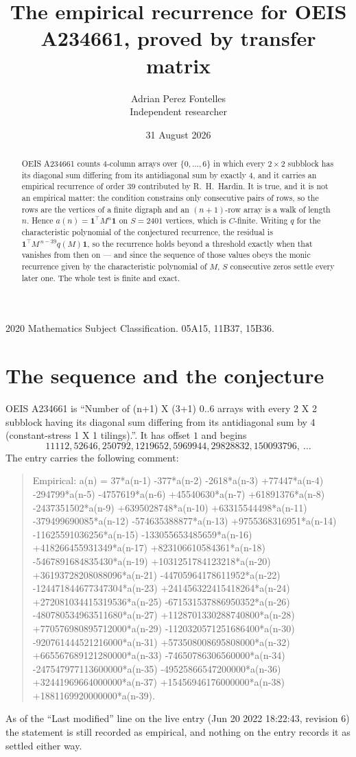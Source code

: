 \documentclass[11pt,a4paper]{article}
\title{The empirical recurrence for OEIS A234661, proved by transfer matrix}
\author{Adrian Perez Fontelles\\ \small Independent researcher}
\date{31 August 2026}
\theoremstyle{plain}
\theoremstyle{definition}
\begin{document}
\maketitle

\begin{abstract}
OEIS A234661 counts $4$-column arrays over $\{0,\dots,6\}$ in which every
$2\times2$ subblock has its diagonal sum differing from its antidiagonal sum by
exactly $4$, and it
carries an empirical recurrence of order $39$ contributed by R.~H.~Hardin. It is true,
and it is not an empirical matter: the condition constrains only consecutive pairs of rows,
so the rows are the vertices of a finite digraph and an $(n+1)$-row array is a walk of
length $n$. Hence $a(n)=\mathbf{1}^{\!\top}M^{n}\mathbf{1}$ on $S=2401$ vertices, which
is $C$-finite. Writing $q$ for the characteristic polynomial of the conjectured recurrence,
the residual is $\mathbf{1}^{\!\top}M^{\,n-39}q(M)\mathbf{1}$, so the recurrence
holds beyond a threshold exactly when that vanishes from then on --- and since the sequence
of those values obeys the monic recurrence given by the characteristic polynomial of $M$,
$S$ consecutive zeros settle every later one. The whole test is finite and exact.
\end{abstract}

\noindent\small 2020 Mathematics Subject Classification. 05A15, 11B37, 15B36.\normalsize

\section{The sequence and the conjecture}

OEIS A234661 is ``Number of (n+1) X (3+1) 0..6 arrays with every 2 X 2 subblock having its diagonal sum differing from its antidiagonal sum by 4 (constant-stress 1 X 1 tilings).''. It has offset
$1$ and begins
\[
11112, 52646, 250792, 1219652, 5969944, 29828832, 150093796,\ \dots
\]
The entry carries the following comment:
\begin{quote}\small
Empirical: a(n) = 37*a(n-1) -377*a(n-2) -2618*a(n-3) +77447*a(n-4) -294799*a(n-5) -4757619*a(n-6) +45540630*a(n-7) +61891376*a(n-8) -2437351502*a(n-9) +6395028748*a(n-10) +63315544498*a(n-11) -379499690085*a(n-12) -574635388877*a(n-13) +9755368316951*a(n-14) -11625591036256*a(n-15) -133055653485659*a(n-16) +418266455931349*a(n-17) +823106610584361*a(n-18) -5467891684835430*a(n-19) +1031251784123218*a(n-20) +36193728208088096*a(n-21) -44705964178611952*a(n-22) -124471844677347304*a(n-23) +241456322415418264*a(n-24) +272081034415319536*a(n-25) -671531537886950352*a(n-26) -480780534963511680*a(n-27) +1128701330288740800*a(n-28) +770576980895712000*a(n-29) -1120320571251686400*a(n-30) -920761444521216000*a(n-31) +573508008695808000*a(n-32) +665567689121280000*a(n-33) -74650786306560000*a(n-34) -247547977113600000*a(n-35) -49525866547200000*a(n-36) +32441969664000000*a(n-37) +15456946176000000*a(n-38) +1881169920000000*a(n-39).
\end{quote}
As of the ``Last modified'' line on the live entry (Jun 20 2022 18:22:43, revision 6) the statement is
still recorded as empirical, and nothing on the entry records it as settled either way.
\end{document}
